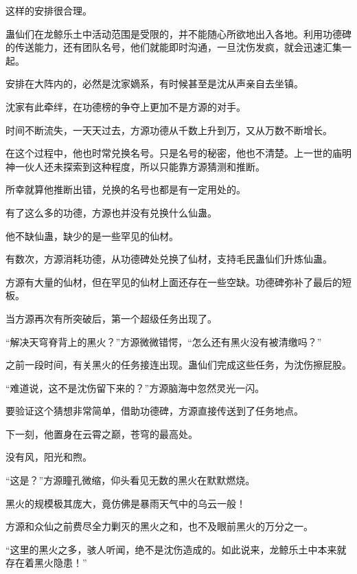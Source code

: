 \begin{this_body}
这样的安排很合理。

蛊仙们在龙鲸乐土中活动范围是受限的，并不能随心所欲地出入各地。利用功德碑的传送能力，还有团队名号，他们就能即时沟通，一旦沈伤发疯，就会迅速汇集一起。

安排在大阵内的，必然是沈家嫡系，有时候甚至是沈从声亲自去坐镇。

沈家有此牵绊，在功德榜的争夺上更加不是方源的对手。

时间不断流失，一天天过去，方源功德从千数上升到万，又从万数不断增长。

在这个过程中，他也时常兑换名号。只是名号的秘密，他也不清楚。上一世的庙明神一伙人还未探索到这种程度，所以只能靠方源猜测和推断。

所幸就算他推断出错，兑换的名号也都是有一定用处的。

有了这么多的功德，方源也并没有兑换什么仙蛊。

他不缺仙蛊，缺少的是一些罕见的仙材。

有数次，方源消耗功德，从功德碑处兑换了仙材，支持毛民蛊仙们升炼仙蛊。

方源有大量的仙材，但在罕见的仙材上面还存在一些空缺。功德碑弥补了最后的短板。

当方源再次有所突破后，第一个超级任务出现了。

“解决天穹脊背上的黑火？”方源微微错愕，“怎么还有黑火没有被清缴吗？”

之前一段时间，有关黑火的任务接连出现。蛊仙们完成这些任务，为沈伤擦屁股。

“难道说，这不是沈伤留下来的？”方源脑海中忽然灵光一闪。

要验证这个猜想非常简单，借助功德碑，方源直接传送到了任务地点。

下一刻，他置身在云霄之巅，苍穹的最高处。

没有风，阳光和煦。

“这是？”方源瞳孔微缩，仰头看见无数的黑火在默默燃烧。

黑火的规模极其庞大，竟仿佛是暴雨天气中的乌云一般！

方源和众仙之前费尽全力剿灭的黑火之和，也不及眼前黑火的万分之一。

“这里的黑火之多，骇人听闻，绝不是沈伤造成的。如此说来，龙鲸乐土中本来就存在着黑火隐患！”

\end{this_body}

